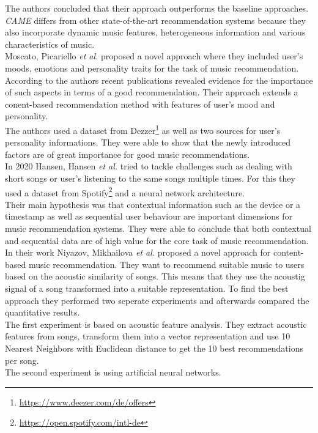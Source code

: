 \documentclass[runningheads,a4paper]{llncs}
\begin{document}
The authors concluded that their approach outperforms the baseline approaches.
\textit{CAME} differs from other state-of-the-art recommendation systems because they 
also incorporate dynamic music features, heterogeneous information and various characteristics of music.
\cite{wang2020came}
\\
Moscato, Picariello \textit{et al.} proposed a novel approach where they included user's moods, emotions and personality traits for the 
task of music recommendation. According to the authors recent publications revealed evidence for the importance of such aspects in terms of 
a good recommendation.
Their approach extends a conent-based recommendation method with features of user's mood and personality.\\
The authors used a dataset from Dezzer\footnote{\url{https://www.deezer.com/de/offers}} as well as two sources for 
user's personality informations. 
They were able to show that the newly introduced factors are of great importance for good music recommendations. \cite{moscato2020emotional}
\\
In 2020 Hansen, Hansen \textit{et al.} tried to tackle challenges such as dealing with short songs or user's listening to the same songs multiple times.
For this they used a dataset from Spotify\footnote{\url{https://open.spotify.com/intl-de}} and a neural network architecture. \\
Their main hypothesis was that contextual information such as the device or a timestamp as well as sequential user behaviour are 
 important dimensions for music recommendation systems.
They were able to conclude that both contextual and sequential data are of high value for the core task of music recommendation. 
\cite{hansen2020contextual}
\\
In their work Niyazov, Mikhailova \textit{et al.} proposed a novel approach for content-based music recommendation. 
They want to recommend suitable music to users based on the acoustic similarity of songs.
This means that they use the acoustig signal of a song transformed into a suitable representation. 
To find the best approach they performed two seperate experiments and afterwards compared the quantitative results.\\
The first experiment is based on acoustic feature analysis. 
They extract acoustic features from songs, transform them into a vector representation and use 10 Nearest Neighbors with Euclidean distance 
to get the 10 best recommendations per song. \\
The second experiment is using artificial neural networks. 
\end{document}
